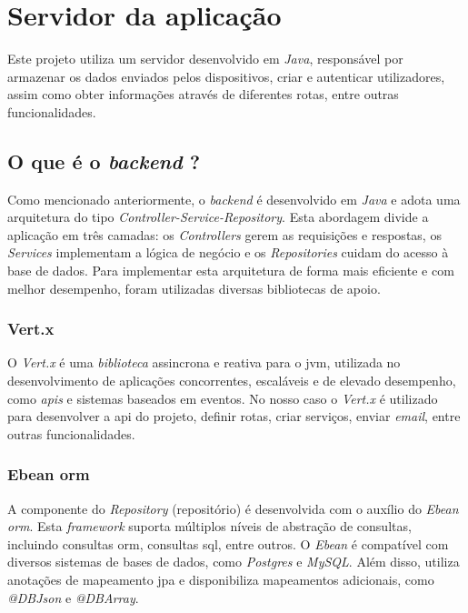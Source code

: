 \clearpage
\section{Servidor da aplicação}
Este projeto utiliza um servidor desenvolvido em \textit{Java}, responsável por armazenar os dados enviados pelos dispositivos, criar e autenticar utilizadores, assim como obter informações através de diferentes rotas, entre outras funcionalidades.

\subsection{O que é o \textit{backend} ?}
Como mencionado anteriormente, o \textit{backend} é desenvolvido em \textit{Java} e adota uma arquitetura do tipo \textit{Controller-Service-Repository}. Esta abordagem divide a aplicação em três camadas: os \textit{Controllers} gerem as requisições e respostas, os \textit{Services} implementam a lógica de negócio e os \textit{Repositories} cuidam do acesso à base de dados. Para implementar esta arquitetura de forma mais eficiente e com melhor desempenho, foram utilizadas diversas bibliotecas de apoio.

\subsubsection{\textbf{Vert.x}}
O \textit{Vert.x} é uma \textit{biblioteca} assincrona e reativa para o \acs{jvm}, utilizada no desenvolvimento de aplicações concorrentes, escaláveis e de elevado desempenho, como \textit{\acs{api}s} e sistemas baseados em eventos. No nosso caso o \textit{Vert.x} é utilizado para desenvolver a \acs{api} do projeto, definir rotas, criar serviços, enviar \textit{email}, entre outras funcionalidades.

\subsubsection{\textbf{Ebean \acs{orm}}}
A componente do \textit{Repository} (repositório) é desenvolvida com o auxílio do \textit{Ebean \acs{orm}}. Esta \textit{framework} suporta múltiplos níveis de abstração de consultas, incluindo consultas \acs{orm}, consultas \acs{sql}, entre outros. O \textit{Ebean} é compatível com diversos sistemas de bases de dados, como \textit{Postgres} e \textit{MySQL}. Além disso, utiliza anotações de mapeamento \acs{jpa} e disponibiliza mapeamentos adicionais, como \textit{@DBJson} e \textit{@DBArray}.

